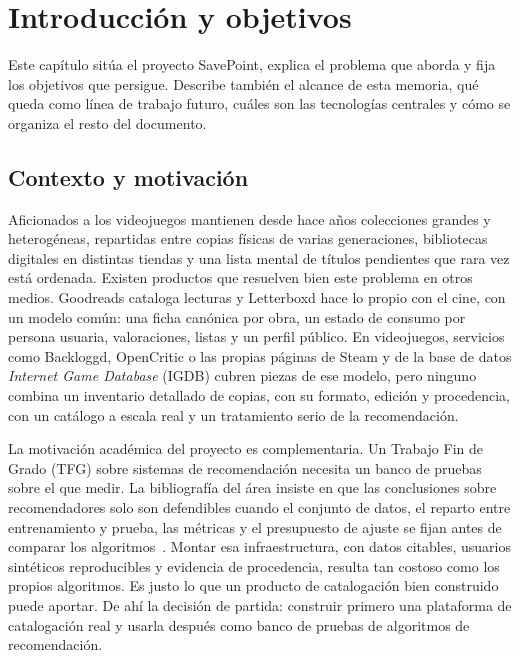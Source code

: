 \chapter{Introducción y objetivos}\label{cap:introduccion}

Este capítulo sitúa el proyecto SavePoint, explica el problema que aborda y fija los
objetivos que persigue. Describe también el alcance de esta memoria, qué queda como línea de
trabajo futuro, cuáles son las tecnologías centrales y cómo se organiza el resto del
documento.

\section{Contexto y motivación}\label{sec:intro-contexto}

Aficionados a los videojuegos mantienen desde hace años colecciones grandes y heterogéneas,
repartidas entre copias físicas de varias generaciones, bibliotecas digitales en distintas
tiendas y una lista mental de títulos pendientes que rara vez está ordenada. Existen
productos que resuelven bien este problema en otros medios. Goodreads cataloga lecturas y
Letterboxd hace lo propio con el cine, con un modelo común: una ficha canónica por obra, un
estado de consumo por persona usuaria, valoraciones, listas y un perfil público. En
videojuegos, servicios como Backloggd, OpenCritic o las propias páginas de Steam y de la base
de datos \textit{Internet Game Database} (IGDB) cubren piezas de ese modelo, pero ninguno
combina un inventario detallado de copias, con su
formato, edición y procedencia, con un catálogo a escala real y un tratamiento serio de la
recomendación.

La motivación académica del proyecto es complementaria. Un Trabajo Fin de Grado (TFG) sobre
sistemas de recomendación necesita un banco de pruebas sobre el que medir. La bibliografía
del área insiste en que las conclusiones sobre recomendadores solo son defendibles cuando el
conjunto de datos, el reparto entre entrenamiento y prueba, las métricas y el presupuesto de
ajuste se fijan antes de comparar los algoritmos~\cite{herlocker2004evaluating,
gunawardana2015evaluating}. Montar esa infraestructura, con datos citables, usuarios
sintéticos reproducibles y evidencia de procedencia, resulta tan costoso como los propios
algoritmos. Es justo lo que un producto de catalogación bien construido puede aportar. De
ahí la decisión de partida: construir primero una plataforma de catalogación real y usarla
después como banco de pruebas de algoritmos de recomendación.

